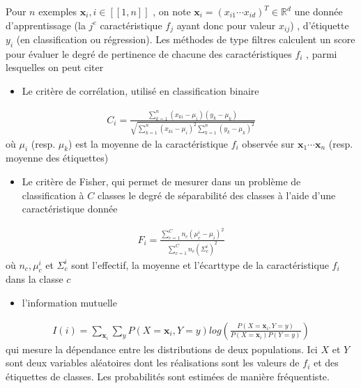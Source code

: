 \documentclass[letterpaper,10pt,french]{sphinxmanual}
\begin{document}
\sphinxAtStartPar
Pour \(n\) exemples  \(\mathbf x_i, i\in[\![1,n]\!]\) , on note \(\mathbf x_i=\left (x_{i1} \cdots x_{id} \right )^T\in\mathbb{R}^d\)  une donnée d’apprentissage (la \(j^e\) caractéristique \(f_j\) ayant donc pour valeur \(x_{ij}\)) , d’étiquette \(y_i\) (en classification ou régression). Les méthodes de type filtres calculent un score pour évaluer le degré de pertinence de chacune des caractéristiques \(f_i\) , parmi lesquelles on peut citer
\begin{itemize}
\item {} 
\sphinxAtStartPar
Le critère de corrélation, utilisé en classification binaire

\end{itemize}
\begin{equation*}
\begin{split}C_i =\frac{\displaystyle\sum_{k=1}^n\left (x_{ki} -\mu_i\right )\left (y_{k} -\mu_k\right )}{\sqrt{\displaystyle\sum_{k=1}^n\left (x_{ki} -\mu_i\right )^2\displaystyle\sum_{k=1}^n\left (y_{k} -\mu_k\right )^2}}\end{split}
\end{equation*}
\sphinxAtStartPar
où \(\mu_i\) (resp. \(\mu_k\)) est la moyenne de la caractéristique \(f_i\) observée sur \(\mathbf x_1\cdots \mathbf x_n\) (resp. moyenne des étiquettes)
\begin{itemize}
\item {} 
\sphinxAtStartPar
Le critère de Fisher,  qui permet de mesurer dans un problème de classification à \(C\) classes le degré de séparabilité des classes à l’aide
d’une caractéristique donnée

\end{itemize}
\begin{equation*}
\begin{split}F_i = \frac{\displaystyle\sum_{c=1}^C n_c\left (\mu_c^i-\mu_i \right )^2}{\displaystyle\sum_{c=1}^C n_c(\Sigma_c^i)^2}\end{split}
\end{equation*}
\sphinxAtStartPar
où \(n_c, \mu_c^i\) et \(\Sigma_c^i\) sont l’effectif, la moyenne et l’écart\sphinxhyphen{}type de la caractéristique  \(f_i\) dans la classe \(c\)
\begin{itemize}
\item {} 
\sphinxAtStartPar
l’information mutuelle

\end{itemize}
\begin{equation*}
\begin{split}I(i) = \displaystyle\sum_{\mathbf x_i} \displaystyle\sum_{y}P(X=\mathbf x_i,Y=y)log\left ( \frac{P(X=\mathbf x_i,Y=y)}{P(X=\mathbf x_i)P(Y=y)}\right )\end{split}
\end{equation*}
\sphinxAtStartPar
qui mesure la dépendance entre les distributions de deux populations. Ici \(X\) et \(Y\) sont deux variables aléatoires dont les réalisations sont les valeurs de \(f_i\) et des étiquettes de classes. Les probabilités sont estimées de manière fréquentiste.
\end{document}
